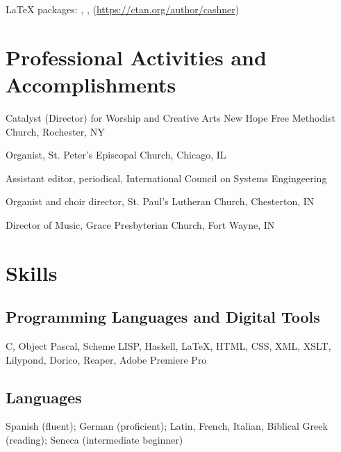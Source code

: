 \documentclass{article}
\begin{document}
{\LaTeX{} packages: , ,
 (\url{https://ctan.org/author/cashner})}

\section{Professional Activities and Accomplishments}
{Catalyst (Director) for Worship and Creative Arts
New Hope Free Methodist Church, Rochester, NY}

{Organist, St. Peter's Episcopal Church, Chicago, IL}

{Assistant editor,  periodical, International Council on
Systems Engingeering}
    
{Organist and choir director, St. Paul's Lutheran Church, Chesterton, IN}
    
{Director of Music, Grace Presbyterian Church, Fort Wayne, IN}


\section{Skills}
\subsection{Programming Languages and Digital Tools}
C, Object Pascal, Scheme LISP, Haskell, \LaTeX, HTML, CSS, XML, XSLT, 
Lilypond, Dorico, Reaper, Adobe Premiere Pro

\subsection{Languages}
Spanish (fluent); German (proficient); Latin, French, Italian,
Biblical Greek (reading); Seneca (intermediate beginner)
\end{document}
